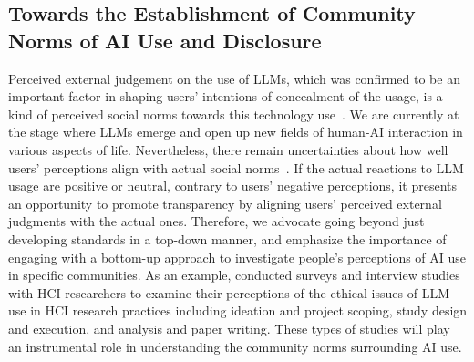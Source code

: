\subsection{Towards the Establishment of Community Norms of AI Use and Disclosure}

Perceived external judgement on the use of LLMs, which was confirmed to be an important factor in shaping users' intentions of concealment of the usage, is a kind of perceived social norms towards this technology use~\cite{choi2013applying, higgs2015social}.
We are currently at the stage where LLMs emerge and open up new fields of human-AI interaction in various aspects of life.
Nevertheless, there remain uncertainties about how well users' perceptions align with actual social norms~\cite{diefenbach2019disrespectful,hechter2001have}.
If the actual reactions to LLM usage are positive or neutral, contrary to users' negative perceptions, it presents an opportunity to promote transparency by aligning users' perceived external judgments with the actual ones.
Therefore, we advocate going beyond just developing standards in a top-down manner, and emphasize the importance of engaging with a bottom-up approach to investigate people's perceptions of AI use in specific communities.
As an example, \citet{kapania2024m} conducted surveys and interview studies with HCI researchers to examine their perceptions of the ethical issues of LLM use in HCI research practices including ideation and project scoping, study design and execution, and analysis and paper writing.
These types of studies will play an instrumental role in understanding the community norms surrounding AI use.

